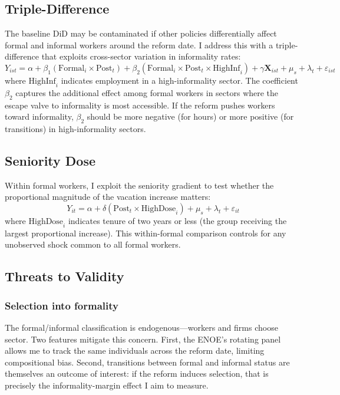 \documentclass[12pt]{article}
\begin{document}
\subsection{Triple-Difference}

The baseline DiD may be contaminated if other policies differentially affect formal and informal workers around the reform date. I address this with a triple-difference that exploits cross-sector variation in informality rates:
\begin{equation}
Y_{ist} = \alpha + \beta_1 (\text{Formal}_i \times \text{Post}_t) + \beta_2 (\text{Formal}_i \times \text{Post}_t \times \text{HighInf}_i) + \gamma \mathbf{X}_{ist} + \mu_s + \lambda_t + \varepsilon_{ist}
\label{eq:ddd}
\end{equation}
where $\text{HighInf}_i$ indicates employment in a high-informality sector. The coefficient $\beta_2$ captures the additional effect among formal workers in sectors where the escape valve to informality is most accessible. If the reform pushes workers toward informality, $\beta_2$ should be more negative (for hours) or more positive (for transitions) in high-informality sectors.

\subsection{Seniority Dose}

Within formal workers, I exploit the seniority gradient to test whether the proportional magnitude of the vacation increase matters:
\begin{equation}
Y_{it} = \alpha + \delta (\text{Post}_t \times \text{HighDose}_i) + \mu_s + \lambda_t + \varepsilon_{it}
\label{eq:dose}
\end{equation}
where $\text{HighDose}_i$ indicates tenure of two years or less (the group receiving the largest proportional increase). This within-formal comparison controls for any unobserved shock common to all formal workers.

\subsection{Threats to Validity}

\subsubsection*{Selection into formality} The formal/informal classification is endogenous---workers and firms choose sector. Two features mitigate this concern. First, the ENOE's rotating panel allows me to track the same individuals across the reform date, limiting compositional bias. Second, transitions between formal and informal status are themselves an outcome of interest: if the reform induces selection, that is precisely the informality-margin effect I aim to measure.
\end{document}
